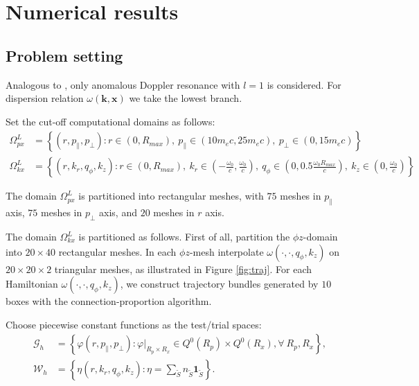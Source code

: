 \documentclass{article}
\numberwithin{equation}{section}
\begin{document}
\section{Numerical results}\label{sec:cylinder_results}
\subsection{Problem setting}
Analogous to \cite{huang2023conservative}, only anomalous Doppler resonance with $l=1$ is considered. For dispersion relation $\omega(\mathbf{k},\mathbf{x})$ we take the lowest branch. 

Set the cut-off computational domains as follows:
\begin{equation*}
    \begin{split}
        \Omega_{px}^{L}&=\left\{ \left(r,p_{\parallel},p_{\perp}\right):r\in\left(0,R_{max}\right),\ p_{\parallel}\in\left(10m_{e}c,25m_{e}c\right),\ p_{\perp}\in\left(0,15m_{e}c\right)\right\} \\
        \Omega_{kx}^{L}&=\left\{ \left(r,k_{r},q_{\phi},k_{z}\right):r\in\left(0,R_{max}\right),\ k_{r}\in\left(-\frac{\omega_{0}}{c},\frac{\omega_{0}}{c}\right),\ q_{\phi}\in\left(0,0.5 \frac{\omega_{0}R_{max}}{c}\right),\ k_{z}\in\left(0,\frac{\omega_{0}}{c}\right)\right\} 
    \end{split}
\end{equation*}

The domain $\Omega^{L}_{px}$ is partitioned into rectangular meshes, with $75$ meshes in $p_{\parallel}$ axis, $75$ meshes in $p_{\perp}$ axis,  and $20$ meshes in $r$ axis.

The domain $\Omega^{L}_{kx}$ is partitioned as follows. First of all, partition the $\phi z$-domain into $20\times40$ rectangular meshes. In each $\phi z$-mesh interpolate $\omega(\cdot, \cdot, q_{\phi}, k_{z})$ on $20\times20\times2$ triangular meshes, as illustrated in Figure \ref{fig:traj}. For each Hamiltonian $\omega(\cdot, \cdot, q_{\phi}, k_{z})$, we construct trajectory bundles generated by $10$ boxes with the connection-proportion algorithm.

Choose piecewise constant functions as the test/trial spaces:
\begin{equation*}
    \begin{split}
        \mathcal{G}_{h}&=\left\{ \varphi\left(r,p_{\parallel},p_{\perp}\right):\varphi|_{R_{p}\times R_{x}}\in Q^{0}(R_{p})\times Q^{0}(R_{x}),\forall~R_{p},R_{x}\right\} ,\\
        \mathcal{W}_{h}&=\left\{ \eta\left(r,k_{r},q_{\phi},k_{z}\right):\eta=\sum_{\widetilde{S}}n_{\widetilde{S}}\mathbf{1}_{\widetilde{S}}\right\} .
    \end{split}
\end{equation*}
\end{document}

